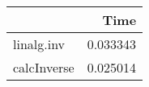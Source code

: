 \begin{tabular}{lr}
\toprule
{} &      Time \\
\midrule
linalg.inv  &  0.033343 \\
calcInverse &  0.025014 \\
\bottomrule
\end{tabular}
